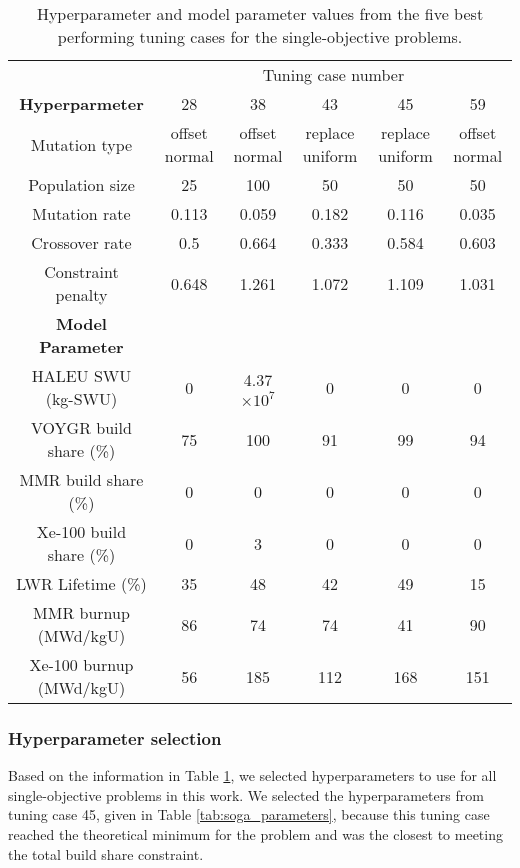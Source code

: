 \begin{table}
    \centering 
    \caption{Hyperparameter and model parameter values from the five best 
    performing tuning cases for the single-objective problems.}
    \label{tab:soga_tuning_results}
    \begin{tabular}{c c c c c c}
        \hline 
        & \multicolumn{5}{c}{Tuning case number} \\
        \textbf{Hyperparmeter} & 28 & 38 & 43 & 45 & 59 \\
        \hline 
        Mutation type & offset normal & offset normal & replace uniform &
        replace uniform & offset normal\\
        Population size & 25 & 100 & 50 & 50 & 50 \\
        Mutation rate & 0.113 & 0.059 & 0.182 & 0.116 & 0.035\\
        Crossover rate & 0.5 & 0.664 & 0.333 & 0.584 & 0.603\\
        Constraint penalty & 0.648 & 1.261 & 1.072 & 1.109 & 1.031\\
        \hline
        \textbf{Model Parameter} \\
        \gls{HALEU} \gls{SWU} (kg-SWU)& 0 & 4.37 $\times 10^7$ & 0 & 0 & 0\\
        VOYGR build share (\%) & 75 & 100 & 91 & 99 & 94\\
        \gls{MMR} build share (\%)& 0 & 0 & 0 & 0 & 0\\
        Xe-100 build share (\%) & 0 & 3 & 0 & 0 & 0\\
        LWR Lifetime (\%)& 35 & 48 & 42 & 49 & 15\\
        \gls{MMR} burnup (MWd/kgU) & 86 & 74 & 74 & 41 & 90\\
        Xe-100 burnup (MWd/kgU) & 56 & 185 & 112 & 168 & 151\\
        \hline 
        
        
    \end{tabular}
\end{table}

\subsubsection{Hyperparameter selection}
Based on the information in Table \ref{tab:soga_tuning_results}, we 
selected hyperparameters to use for all single-objective problems in this 
work. We selected the hyperparameters from tuning case 45, given in 
Table \ref{tab:soga_parameters}, because this tuning case reached the 
theoretical minimum for the problem and was the closest to meeting 
the total build share constraint. 

